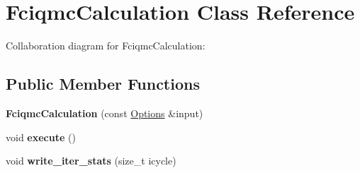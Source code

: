 \hypertarget{classFciqmcCalculation}{}\section{Fciqmc\+Calculation Class Reference}
\label{classFciqmcCalculation}


Collaboration diagram for Fciqmc\+Calculation\+:
\subsection*{Public Member Functions}
\begin{DoxyCompactItemize}
\item 
{\bfseries Fciqmc\+Calculation} (const \hyperlink{structOptions}{Options} \&input)\hypertarget{classFciqmcCalculation_a7ad3b249a7b10c8a4e199f7b5b1cd3a6}{}\label{classFciqmcCalculation_a7ad3b249a7b10c8a4e199f7b5b1cd3a6}

\item 
void {\bfseries execute} ()\hypertarget{classFciqmcCalculation_a4dd7b05054552de32424ef19221f89db}{}\label{classFciqmcCalculation_a4dd7b05054552de32424ef19221f89db}

\item 
void {\bfseries write\+\_\+iter\+\_\+stats} (size\+\_\+t icycle)\hypertarget{classFciqmcCalculation_ae315657d8686933c407fa66d08997820}{}\label{classFciqmcCalculation_ae315657d8686933c407fa66d08997820}

\end{DoxyCompactItemize}
